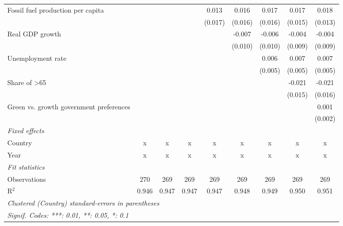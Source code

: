 \begin{table}[htbp]
\begin{tabular}{lcccccccc}
      Fossil fuel production per capita               &                &                &         & 0.013   & 0.016   & 0.017   & 0.017   & 0.018\\   
                                                      &                &                &         & (0.017) & (0.016) & (0.016) & (0.015) & (0.013)\\   
      Real GDP growth                                 &                &                &         &         & -0.007  & -0.006  & -0.004  & -0.004\\   
                                                      &                &                &         &         & (0.010) & (0.010) & (0.009) & (0.009)\\   
      Unemployment rate                               &                &                &         &         &         & 0.006   & 0.007   & 0.007\\   
                                                      &                &                &         &         &         & (0.005) & (0.005) & (0.005)\\   
      Share of >65                                    &                &                &         &         &         &         & -0.021  & -0.021\\   
                                                      &                &                &         &         &         &         & (0.015) & (0.016)\\   
      Green vs. growth government preferences         &                &                &         &         &         &         &         & 0.001\\   
                                                      &                &                &         &         &         &         &         & (0.002)\\   
      \emph{Fixed effects}\\
      Country                                         & x              & x              & x       & x       & x       & x       & x       & x\\  
      Year                                            & x              & x              & x       & x       & x       & x       & x       & x\\  
      \midrule \emph{Fit statistics}\\
      Observations                                    & 270            & 269            & 269     & 269     & 269     & 269     & 269     & 269\\  
      R$^2$                                           & 0.946          & 0.947          & 0.947   & 0.947   & 0.948   & 0.949   & 0.950   & 0.951\\  
      \midrule
      \multicolumn{9}{l}{\emph{Clustered (Country) standard-errors in parentheses}}\\
      \multicolumn{9}{l}{\emph{Signif. Codes: ***: 0.01, **: 0.05, *: 0.1}}\\
   \end{tabular}
\end{table}


